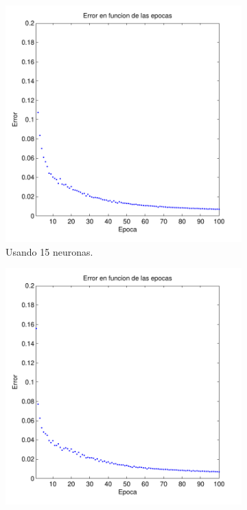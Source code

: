 \documentclass[informe.tex]{subfiles}
\begin{document}
    \begin{figure}
        \centering
        \begin{subfigure}[b]{0.32\textwidth}
                \includegraphics[width=\textwidth]{graficos/error_fold1_15_binary_100_04.pdf}
                \caption{Usando 15 neuronas.}
                \label{fig:d1-f1-04-n15}
        \end{subfigure}
        \begin{subfigure}[b]{0.32\textwidth}
                \includegraphics[width=\textwidth]{graficos/error_fold1_20_binary_100_04.pdf}

\end{subfigure}
\end{figure}
\end{document}
